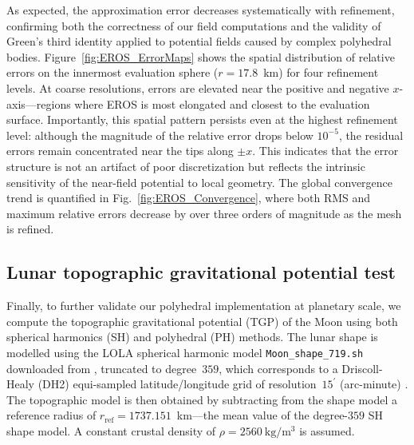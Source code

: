 \documentclass{seg}
\begin{document}
As expected, the approximation error decreases systematically with refinement, confirming both the correctness of our field computations and the validity of Green's third identity applied to potential fields caused by complex polyhedral bodies. Figure~\ref{fig:EROS_ErrorMaps} shows the spatial distribution of relative errors on the innermost evaluation sphere ($r = 17.8$~km) for four refinement levels. At coarse resolutions, errors are elevated near the positive and negative $x$-axis—regions where EROS is most elongated and closest to the evaluation surface. Importantly, this spatial pattern persists even at the highest refinement level: although the magnitude of the relative error drops below $10^{-5}$, the residual errors remain concentrated near the tips along $\pm x$. This indicates that the error structure is not an artifact of poor discretization but reflects the intrinsic sensitivity of the near-field potential to local geometry. The global convergence trend is quantified in Fig.~\ref{fig:EROS_Convergence}, where both RMS and maximum relative errors decrease by over three orders of magnitude as the mesh is refined.

\subsection{Lunar topographic gravitational potential test}

Finally, to further validate our polyhedral implementation at planetary scale, we compute the topographic gravitational potential (TGP) of the Moon using both spherical harmonics (SH) and polyhedral (PH) methods. The lunar shape is modelled using the LOLA spherical harmonic model \texttt{Moon\_shape\_719.sh} downloaded from \citet{Wieczorek2024}, truncated to degree~$359$, which corresponds to a Driscoll-Healy (DH2) equi-sampled latitude/longitude grid of resolution~$15^{\prime}$ (arc-minute) \citep{Driscoll1994AdvancesinAppliedMathematics,Wieczorek2018GeochemGeophysGeosyst}. The topographic model is then obtained by subtracting from the shape model a reference radius of $r_{\mathrm{ref}} = 1737.151$~km—the mean value of the degree-$359$ SH shape model. A constant crustal density of $\rho = 2560~\mathrm{kg/m^3}$ is assumed.
\end{document}
